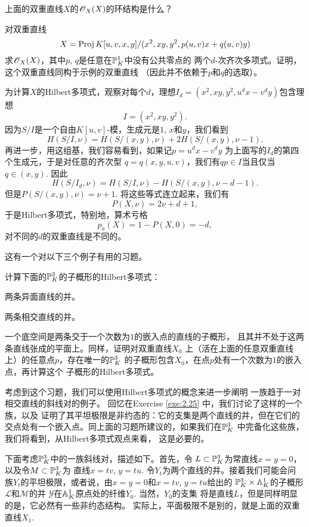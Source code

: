 \begin{exe}\label{exe:3.64}
上面的双重直线$X$的$\oo_X(X)$的环结构是什么？
\end{exe}

\begin{exe}\label{exe:3.65}
对双重直线
\[
	X=\proj K[u,v,x,y]/(x^2,xy,y^2,p(u,v)x+q(u,v)y)
\]
求$\oo_X(X)$，其中$p$, $q$是任意在$\P_K^1$中没有公共零点的
两个$d$-次齐次多项式。证明，这个双重直线同构于示例的双重直线
（因此并不依赖于$p$和$q$的选取）。
\end{exe}

为计算$X$的Hilbert多项式，观察对每个$d$，理想$I_d=(x^2,xy,y^2,
u^dx-v^dy)$包含理想
\[
	I=(x^2,xy,y^2).
\]
因为$S/I$是一个自由$K[u,v]$-模，生成元是$1$, $x$和$y$，我们看到
\[
	H(S/I,\nu)=H(S/(x,y),\nu)+2H(S/(x,y),\nu-1).
\]
再进一步，用这组基，我们容易看到，如果记$p=u^dx-v^dy$
为上面写的$I_d$的第四个生成元，于是对任意的齐次型
$q=q(x,y,u,v)$，我们有$qp\in I$当且仅当$q\in (x,y)$. 因此
\[
	H(S/I_d,\nu)=H(S/I,\nu)-H(S/(x,y),\nu-d-1).
\]
但是$P(S/(x,y),\nu)=\nu+1$. 将这些等式连立起来，我们有
\[
	P(X,\nu)=2\nu+d+1,
\]
于是Hilbert多项式，特别地，算术亏格
\[
	p_a(X)=1-P(X,0)=-d,
\]
对不同的$d$的双重直线是不同的。

这有一个对以下三个例子有用的习题。


\begin{exe}\label{exe:3.66}
计算下面的$\P_K^3$的子概形的Hilbert多项式：
\begin{compactenum}[(a)]
\item 两条异面直线的并。
\item 两条相交直线的并。
\item 一个底空间是两条交于一个次数为$1$的嵌入点的直线的子概形，
且其并不处于这两条直线张成的平面上。同样，证明对双重直线$X_0$
上（活在上面的任意双重直线上）的任意点$p$，存在唯一的$\P_K^3$
的子概形包含$X_0$，在点$p$处有一个次数为$1$的嵌入点，再计算这个
子概形的Hilbert多项式。
\end{compactenum}
\end{exe}

考虑到这个习题，我们可以使用Hilbert多项式的概念来进一步阐明
一族趋于一对相交直线的斜线对的例子。
回忆在Exercise \ref{exe:2.25} 中，我们讨论了这样的一个族，以及
证明了其平坦极限是非约态的：它的支集是两个直线的并，但在它们的
交点处有一个嵌入点。同上面的习题所建议的，如果我们在$\P_K^3$
中完备化这些族，我们将看到，从Hilbert多项式观点来看，
这是必要的。

下面考虑$\P_K^3$中的一族斜线对，描述如下。首先，令
$L\subset \P_K^3$为常直线$x=y=0$，以及令$M\subset \P_K^3$为
直线$x=tv$, $y=tu$. 令$Y_t$为两个直线的并。接着我们可能会问
族$Y_t$的平坦极限，或者说，由$x=y=0$和$x=tv$, $y=tu$给出的
$\P_K^3\times \A_K^1$的子概形$\mathscr L$和$\mathscr M$的并
$\mathscr Y$在$\A_K^1$原点处的纤维$Y_0$. 当然，$Y_0$的支集
将是直线$L$，但是同样明显的是，它必然有一些非约态结构。
实际上，平面极限不是别的，就是上面的双重直线$X_1$.


